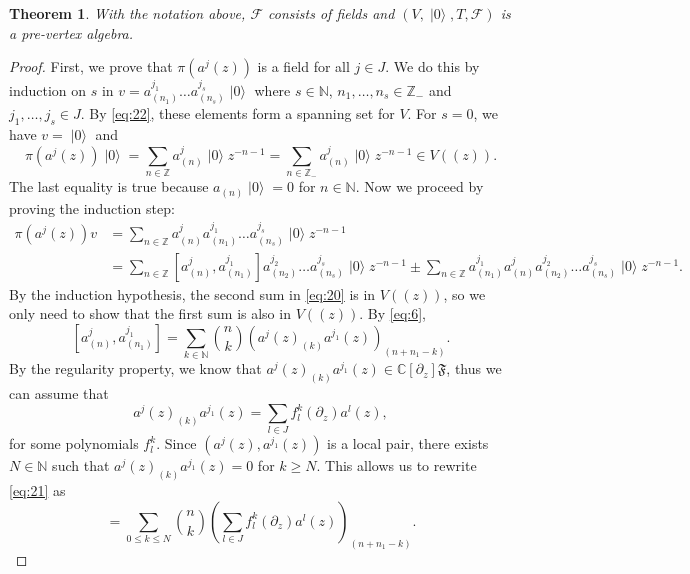 \documentclass[a4paper, 12pt, reqno]{amsart}
\newtheorem{theorem}{Theorem}[subsection]
\theoremstyle{remark}
\numberwithin{equation}{subsection}
\DeclareMathOperator{\vac}{|0\rangle}
\begin{document}
\begin{theorem}
  \label{thr:16}
  With the notation above, $\mathcal{F}$ consists of fields and $(V, \vac, T, \mathcal{F})$ is a pre-vertex algebra.
\end{theorem}

\begin{proof}
  First, we prove that $\pi(a^j(z))$ is a field for all $j \in J$.
  We do this by induction on $s$ in $v = a^{j_1}_{(n_1)}\dots a^{j_s}_{(n_s)}\vac$ where $s \in \mathbb{N}$, $n_1, \dots, n_s \in \mathbb{Z}_-$ and $j_1, \dots, j_s \in J$.
  By \eqref{eq:22}, these elements form a spanning set for $V$.
  For $s = 0$, we have $v = \vac$ and
  \begin{equation*}
    \pi(a^j(z))\vac = \sum_{n \in \mathbb{Z}} a^j_{(n)}\vac z^{-n - 1} = \sum_{n \in \mathbb{Z}_-} a^j_{(n)}\vac z^{-n - 1} \in V((z)).
  \end{equation*}
  The last equality is true because $a_{(n)}\vac = 0$ for $n \in \mathbb{N}$.
  Now we proceed by proving the induction step:
  \begin{align}
    \nonumber
    \pi(a^j(z))v &= \sum_{n \in \mathbb{Z}}a^j_{(n)}a^{j_1}_{(n_1)}\dots a^{j_s}_{(n_s)}\vac z^{-n - 1} \\
    \label{eq:20}
    &= \sum_{n \in \mathbb{Z}} [a^j_{(n)}, a^{j_1}_{(n_1)}]a^{j_2}_{(n_2)}\dots a^{j_s}_{(n_s)}\vac z^{-n - 1} \pm \sum_{n \in \mathbb{Z}}a^{j_1}_{(n_1)}a^j_{(n)}a^{j_2}_{(n_2)}\dots a^{j_s}_{(n_s)}\vac z^{-n - 1}.
  \end{align}
  By the induction hypothesis, the second sum in \eqref{eq:20} is in $V((z))$, so we only need to show that the first sum is also in $V((z))$.
  By \eqref{eq:6},
  \begin{equation}
    \label{eq:21}
    [a^j_{(n)}, a^{j_1}_{(n_1)}] = \sum_{k \in \mathbb{N}}\binom{n}{k}(a^j(z)_{(k)}a^{j_1}(z))_{(n + n_1 - k)}.
  \end{equation}
  By the regularity property, we know that $a^j(z)_{(k)}a^{j_1}(z) \in \mathbb{C}[\partial_z]\mathfrak{F}$, thus we can assume that
  \begin{equation*}
    a^j(z)_{(k)}a^{j_1}(z) = \sum_{l \in J}f^k_l(\partial_z)a^l(z),
  \end{equation*}
  for some polynomials $f^k_l$.
  Since $(a^j(z), a^{j_1}(z))$ is a local pair, there exists $N \in \mathbb{N}$ such that $a^j(z)_{(k)}a^{j_1}(z) = 0$ for $k \ge N$.
  This allows us to rewrite \eqref{eq:21} as
  \begin{equation*}
    [a^j_{(n)}, a^{j_1}_{(n_1)}] = \sum_{0 \le k \le N}\binom{n}{k}\left(\sum_{l \in J}f^k_l(\partial_z)a^l(z)\right)_{(n + n_1 - k)}.

\end{equation*}
\end{proof}
\end{document}

